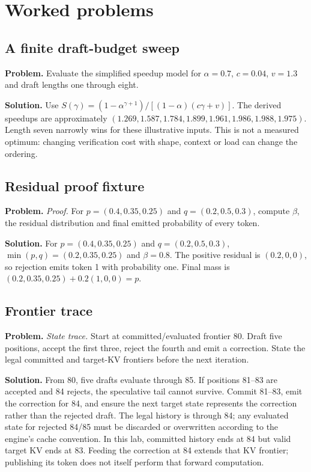 \section{Worked problems}

\subsection{A finite draft-budget sweep}
\textbf{Problem.} Evaluate the simplified speedup model for
$\alpha=0.7$, $c=0.04$, $v=1.3$ and draft lengths one through eight.

\textbf{Solution.} Use
$S(\gamma)=(1-\alpha^{\gamma+1})/[(1-\alpha)(c\gamma+v)]$.
The derived speedups are approximately
$(1.269,1.587,1.784,1.899,1.961,1.986,1.988,1.975)$.
Length seven narrowly wins for these illustrative inputs. This is not a
measured optimum: changing verification cost with shape, context or load
can change the ordering.

\subsection{Residual proof fixture}
\textbf{Problem.} \emph{Proof.} For $p=(0.4,0.35,0.25)$ and $q=(0.2,0.5,0.3)$, compute
$\beta$, the residual distribution and final emitted probability of every token.

\textbf{Solution.} For $p=(0.4,0.35,0.25)$ and $q=(0.2,0.5,0.3)$,
$\min(p,q)=(0.2,0.35,0.25)$ and $\beta=0.8$. The positive residual is
$(0.2,0,0)$, so rejection emits token 1 with probability one. Final mass is
$(0.2,0.35,0.25)+0.2(1,0,0)=p$.

\subsection{Frontier trace}
\textbf{Problem.} \emph{State trace.} Start at committed/evaluated frontier 80. Draft five
positions, accept the first three, reject the fourth and emit a correction. State the
legal committed and target-KV frontiers before the next iteration.

\textbf{Solution.} From 80, five drafts evaluate through 85. If positions 81--83 are accepted and 84
rejects, the speculative tail cannot survive. Commit 81--83, emit the correction for
84, and ensure the next target state represents the correction rather than the rejected
draft. The legal history is through 84; any evaluated state for rejected 84/85 must be
discarded or overwritten according to the engine's cache convention.
In this lab, committed history ends at 84 but valid target KV ends at 83.
Feeding the correction at 84 extends that KV frontier; publishing its token
does not itself perform that forward computation.

